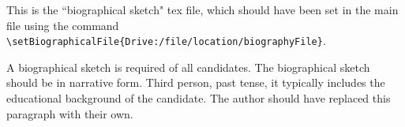 This is the ``biographical sketch" tex file, which should have been set in the main file using the command \verb|\setBiographicalFile{Drive:/file/location/biographyFile}|.

A biographical sketch is required of all candidates. The biographical sketch should be in narrative form. Third person, past tense, it typically includes the educational background of the candidate. The author should have replaced this paragraph with their own.